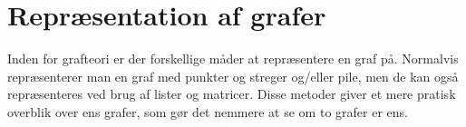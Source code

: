 \section{Repræsentation af grafer}
Inden for grafteori er der forskellige måder at repræsentere en graf på. Normalvis repræsenterer man en graf med punkter og streger og/eller pile, men de kan også repræsenteres ved brug af lister og matricer. Disse metoder giver et mere pratisk overblik over ens grafer, som gør det nemmere at se om to grafer er ens.
